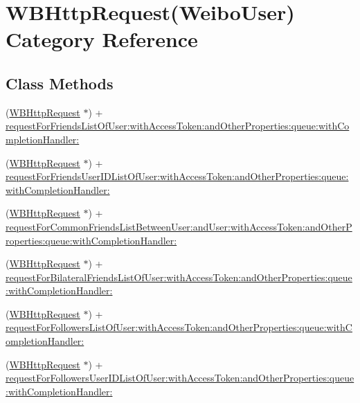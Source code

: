 \hypertarget{category_w_b_http_request_07_weibo_user_08}{}\section{W\+B\+Http\+Request(Weibo\+User) Category Reference}
\label{category_w_b_http_request_07_weibo_user_08}
\subsection*{Class Methods}
\begin{DoxyCompactItemize}
\item 
(\mbox{\hyperlink{interface_w_b_http_request}{W\+B\+Http\+Request}} $\ast$) + \mbox{\hyperlink{category_w_b_http_request_07_weibo_user_08_a6bec26ae942e00b30352846353c10f4d}{request\+For\+Friends\+List\+Of\+User\+:with\+Access\+Token\+:and\+Other\+Properties\+:queue\+:with\+Completion\+Handler\+:}}
\item 
(\mbox{\hyperlink{interface_w_b_http_request}{W\+B\+Http\+Request}} $\ast$) + \mbox{\hyperlink{category_w_b_http_request_07_weibo_user_08_a388ba16ea6e89e121893833f2a7d7b86}{request\+For\+Friends\+User\+I\+D\+List\+Of\+User\+:with\+Access\+Token\+:and\+Other\+Properties\+:queue\+:with\+Completion\+Handler\+:}}
\item 
(\mbox{\hyperlink{interface_w_b_http_request}{W\+B\+Http\+Request}} $\ast$) + \mbox{\hyperlink{category_w_b_http_request_07_weibo_user_08_a869234d6cc01353dcfc8f0f47ad06f5c}{request\+For\+Common\+Friends\+List\+Between\+User\+:and\+User\+:with\+Access\+Token\+:and\+Other\+Properties\+:queue\+:with\+Completion\+Handler\+:}}
\item 
(\mbox{\hyperlink{interface_w_b_http_request}{W\+B\+Http\+Request}} $\ast$) + \mbox{\hyperlink{category_w_b_http_request_07_weibo_user_08_a8266e8e1c5230407f29ee63e05e98b38}{request\+For\+Bilateral\+Friends\+List\+Of\+User\+:with\+Access\+Token\+:and\+Other\+Properties\+:queue\+:with\+Completion\+Handler\+:}}
\item 
(\mbox{\hyperlink{interface_w_b_http_request}{W\+B\+Http\+Request}} $\ast$) + \mbox{\hyperlink{category_w_b_http_request_07_weibo_user_08_a0437dae63fa8fe40c7c5b323b45e0094}{request\+For\+Followers\+List\+Of\+User\+:with\+Access\+Token\+:and\+Other\+Properties\+:queue\+:with\+Completion\+Handler\+:}}
\item 
(\mbox{\hyperlink{interface_w_b_http_request}{W\+B\+Http\+Request}} $\ast$) + \mbox{\hyperlink{category_w_b_http_request_07_weibo_user_08_a62303f19ac35267cff108384061f1de7}{request\+For\+Followers\+User\+I\+D\+List\+Of\+User\+:with\+Access\+Token\+:and\+Other\+Properties\+:queue\+:with\+Completion\+Handler\+:}}

\end{DoxyCompactItemize}
